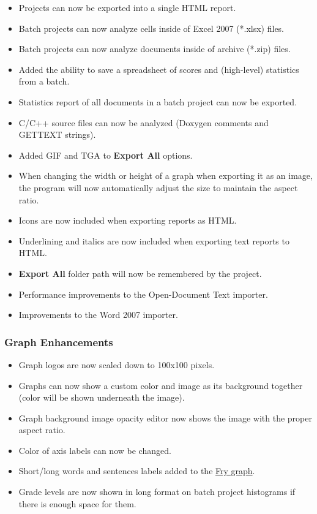 \documentclass[
]{book}
\providecommand{\tightlist}{%
  \setlength{\itemsep}{0pt}\setlength{\parskip}{0pt}}
\theoremstyle{definition}
\theoremstyle{definition}
\theoremstyle{definition}
\theoremstyle{definition}
\theoremstyle{remark}
\begin{document}
\begin{itemize}
\tightlist
\item
  Projects can now be exported into a single HTML report.
\item
  Batch projects can now analyze cells inside of Excel 2007 (*.xlsx) files.
\item
  Batch projects can now analyze documents inside of archive (*.zip) files.
\item
  Added the ability to save a spreadsheet of scores and (high-level) statistics from a batch.
\item
  Statistics report of all documents in a batch project can now be exported.
\item
  C/C++ source files can now be analyzed (Doxygen comments and GETTEXT strings).
\item
  Added GIF and TGA to \textbf{Export All} options.
\item
  When changing the width or height of a graph when exporting it as an image, the program will now automatically adjust the size to maintain the aspect ratio.
\item
  Icons are now included when exporting reports as HTML.
\item
  Underlining and italics are now included when exporting text reports to HTML.
\item
  \textbf{Export All} folder path will now be remembered by the project.
\item
  Performance improvements to the Open-Document Text importer.
\item
  Improvements to the Word 2007 importer.
\end{itemize}

\hypertarget{graph-enhancements-2}{%
\subsubsection*{Graph Enhancements}\label{graph-enhancements-2}}

\begin{itemize}
\tightlist
\item
  Graph logos are now scaled down to 100x100 pixels.
\item
  Graphs can now show a custom color and image as its background together (color will be shown underneath the image).
\item
  Graph background image opacity editor now shows the image with the proper aspect ratio.
\item
  Color of axis labels can now be changed.
\item
  Short/long words and sentences labels added to the \protect\hyperlink{fry-test}{Fry graph}.
\item
  Grade levels are now shown in long format on batch project histograms if there is enough space for them.
\end{itemize}
\end{document}
